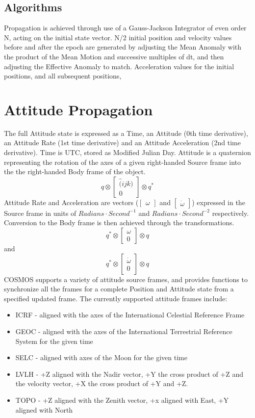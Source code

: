 \documentclass[12pt,letterpaper]{paper}
\begin{document}
\subsection{Algorithms}
Propagation is achieved through use of a Gauss-Jackson Integrator of even order N, acting on the initial state vector. N/2 initial position and velocity values before and after the epoch are generated by adjusting the Mean Anomaly with the product of the Mean Motion and successive multiples of dt, and then adjusting the Effective Anomaly to match. Acceleration values for the initial positions, and all subsequent positions, 

\section{Attitude Propagation}
The full Attitude state is expressed as a Time, an Attitude (0th time derivative), an Attitude Rate (1st time derivative) and an Attitude Acceleration (2nd time derivative). Time is UTC, stored as Modified Julian Day. Attitude is a quaternion representing the rotation of the axes of a given right-handed Source frame into the the right-handed Body frame of the object.
\[q \otimes \begin{bmatrix} \hat(ijk)\\0 \end{bmatrix} \otimes q^{*}\]
Attitude Rate and Acceleration are vectors ($\begin{bmatrix}\omega\end{bmatrix}$ and $\begin{bmatrix}\dot{\omega}\end{bmatrix}$) expressed in the Source frame in units of $Radians \cdot Second^{-1}$ and $Radians \cdot Second^{-2}$ respectively. Conversion to the Body frame is then achieved through the transformations.
\[q^{*} \otimes \begin{bmatrix} \omega\\0 \end{bmatrix} \otimes q\] and \[q^{*} \otimes \begin{bmatrix} \dot{\omega}\\0 \end{bmatrix} \otimes q\]
COSMOS supports a variety of attitude source frames, and provides functions to synchronize all the frames for a complete Position and Attitude state from a specified updated frame. The currently supported attitude frames include:
\begin{itemize}
\item ICRF - aligned with the axes of the International Celestial Reference Frame
\item GEOC - aligned with the axes of the International Terrestrial Reference System for the given time
\item SELC - aligned with axes of the Moon for the given time
\item LVLH - +Z aligned with the Nadir vector, +Y the cross product of +Z and the velocity vector, +X the cross product of +Y and +Z.
\item TOPO - +Z aligned with the Zenith vector, +x aligned with East, +Y aligned with North
\end{itemize}
\end{document}
